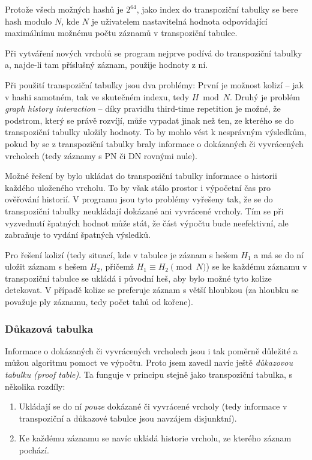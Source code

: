 \documentclass{article}
\begin{document}
Protože všech možných hashů je \(2^{64}\), jako index do transpoziční tabulky
se bere hash modulo \(N\), kde \(N\) je uživatelem nastavitelná hodnota 
odpovídající maximálnímu možnému počtu záznamů v transpoziční tabulce.

Při vytváření nových vrcholů se program nejprve podívá do transpoziční tabulky
a, najde-li tam příslušný záznam, použije hodnoty z ní.

Při použití transpoziční tabulky jsou dva problémy: První je možnost kolizí --
jak v hashi samotném, tak ve skutečném indexu, tedy \(H \bmod N\). Druhý je
problém \emph{graph history interaction} -- díky pravidlu third-time repetition
je možné, že podstrom, který se právě rozvíjí, může vypadat jinak než ten, ze
kterého se do transpoziční tabulky uložily hodnoty. To by mohlo vést k 
nesprávným výsledkům, pokud by se z transpoziční tabulky braly informace o
dokázaných či vyvrácených vrcholech (tedy záznamy s PN či DN rovnými nule). 

Možné řešení by bylo ukládat do transpoziční tabulky informace o historii
každého uloženého vrcholu. To by však stálo prostor i výpočetní čas pro 
ověřování historií. V programu jsou tyto problémy vyřešeny tak, že se do
transpoziční tabulky neukládají dokázané ani vyvrácené vrcholy. Tím se při
vyzvednutí špatných hodnot může stát, že část výpočtu bude neefektivní, ale 
zabraňuje to vydání špatných výsledků.

Pro řešení kolizí (tedy situací, kde v tabulce je záznam s hešem \(H_1\) a má se
do ní uložit záznam s hešem \(H_2\), přičemž \(H_1 \equiv H_2 \pmod N\)) se ke
každému záznamu v transpoziční tabulce se ukládá i původní heš, aby bylo možné 
tyto kolize detekovat. V případě kolize se preferuje záznam s větší hloubkou (za 
hloubku se považuje ply záznamu, tedy počet tahů od kořene).

\subsubsection{Důkazová tabulka}
\label{sec:heur-pt}
Informace o dokázaných či vyvrácených vrcholech jsou i tak poměrně důležité a
můžou algoritmu pomoct ve výpočtu. Proto jsem zavedl navíc ještě \emph{důkazovou
tabulku (proof table)}. Ta funguje v principu stejně jako transpoziční tabulka,
s několika rozdíly:\begin{enumerate}
\item Ukládají se do ní \emph{pouze} dokázané či vyvrácené vrcholy (tedy 
  informace v transpoziční a důkazové tabulce jsou navzájem disjunktní).
\item Ke každému záznamu se navíc ukládá historie vrcholu, ze kterého záznam
  pochází.
\end{enumerate}
\end{document}
